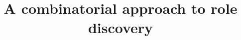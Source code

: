 \documentclass[conference]{IEEEtran}
\begin{document}
\title{A combinatorial approach to role discovery}

%
%
%
%
%

%
%
%
\end{document}
